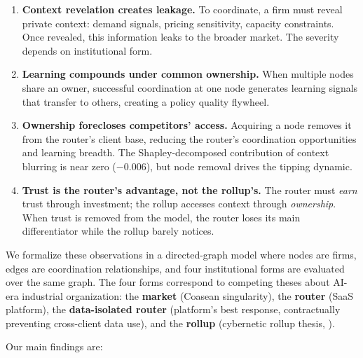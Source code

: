 \documentclass[12pt]{article}
\theoremstyle{definition}
\begin{document}
\begin{enumerate}[leftmargin=*]
\item \textbf{Context revelation creates leakage.} To coordinate, a firm must reveal private context: demand signals, pricing sensitivity, capacity constraints. Once revealed, this information leaks to the broader market. The severity depends on institutional form.

\item \textbf{Learning compounds under common ownership.} When multiple nodes share an owner, successful coordination at one node generates learning signals that transfer to others, creating a policy quality flywheel.

\item \textbf{Ownership forecloses competitors' access.} Acquiring a node removes it from the router's client base, reducing the router's coordination opportunities and learning breadth. The Shapley-decomposed contribution of context blurring is near zero ($-0.006$), but node removal drives the tipping dynamic.

\item \textbf{Trust is the router's advantage, not the rollup's.} The router must \textit{earn} trust through investment; the rollup accesses context through \textit{ownership}. When trust is removed from the model, the router loses its main differentiator while the rollup barely notices.
\end{enumerate}

We formalize these observations in a directed-graph model where nodes are firms, edges are coordination relationships, and four institutional forms are evaluated over the same graph. The four forms correspond to competing theses about AI-era industrial organization: the \textbf{market} (Coasean singularity), the \textbf{router} (SaaS platform), the \textbf{data-isolated router} (platform's best response, contractually preventing cross-client data use), and the \textbf{rollup} (cybernetic rollup thesis, \citet{larson2025cybernetic, hobart2024routers}).

Our main findings are:
\end{document}
